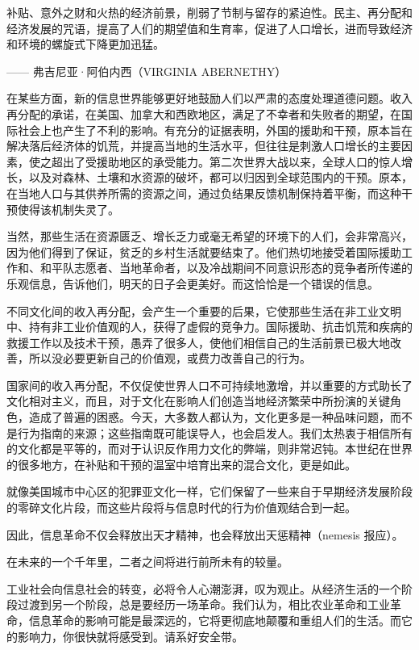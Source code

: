 \begin{tcolorbox}
补贴、意外之财和火热的经济前景，削弱了节制与留存的紧迫性。民主、再分配和经济发展的咒语，提高了人们的期望值和生育率，促进了人口增长，进而导致经济和环境的螺旋式下降更加迅猛。
\begin{flushright}
—— 弗吉尼亚·阿伯内西（VIRGINIA ABERNETHY）
\end{flushright}
\end{tcolorbox}


在某些方面，新的信息世界能够更好地鼓励人们以严肃的态度处理道德问题。收入再分配的承诺，在美国、加拿大和西欧地区，满足了不幸者和失败者的期望，在国际社会上也产生了不利的影响。有充分的证据表明，外国的援助和干预，原本旨在解决落后经济体的饥荒，并提高当地的生活水平，但往往是刺激人口增长的主要因素，使之超出了受援助地区的承受能力。第二次世界大战以来，全球人口的惊人增长，以及对森林、土壤和水资源的破坏，都可以归因到全球范围内的干预。原本，在当地人口与其供养所需的资源之间，通过负结果反馈机制保持着平衡，而这种干预使得该机制失灵了。

当然，那些生活在资源匮乏、增长乏力或毫无希望的环境下的人们，会非常高兴，因为他们得到了保证，贫乏的乡村生活就要结束了。他们热切地接受着国际援助工作和、和平队志愿者、当地革命者，以及冷战期间不同意识形态的竞争者所传递的乐观信息，告诉他们，明天的日子会更美好。而这恰恰是一个错误的信息。

不同文化间的收入再分配，会产生一个重要的后果，它使那些生活在非工业文明中、持有非工业价值观的人，获得了虚假的竞争力。国际援助、抗击饥荒和疾病的救援工作以及技术干预，愚弄了很多人，使他们相信自己的生活前景已极大地改善，所以没必要更新自己的价值观，或费力改善自己的行为。

国家间的收入再分配，不仅促使世界人口不可持续地激增，并以重要的方式助长了文化相对主义，而且，对于文化在影响人们创造当地经济繁荣中所扮演的关键角色，造成了普遍的困惑。今天，大多数人都认为，文化更多是一种品味问题，而不是行为指南的来源；这些指南既可能误导人，也会启发人。我们太热衷于相信所有的文化都是平等的，而对于认识反作用力文化的弊端，则非常迟钝。本世纪在世界的很多地方，在补贴和干预的温室中培育出来的混合文化，更是如此。

就像美国城市中心区的犯罪亚文化一样，它们保留了一些来自于早期经济发展阶段的零碎文化片段，而这些片段将与信息时代的行为价值观结合到一起。

因此，信息革命不仅会释放出天才精神，也会释放出天惩精神（nemesis 报应）。

在未来的一个千年里，二者之间将进行前所未有的较量。

工业社会向信息社会的转变，必将令人心潮澎湃，叹为观止。从经济生活的一个阶段过渡到另一个阶段，总是要经历一场革命。我们认为，相比农业革命和工业革命，信息革命的影响可能是最深远的，它将更彻底地颠覆和重组人们的生活。而它的影响力，你很快就将感受到。请系好安全带。